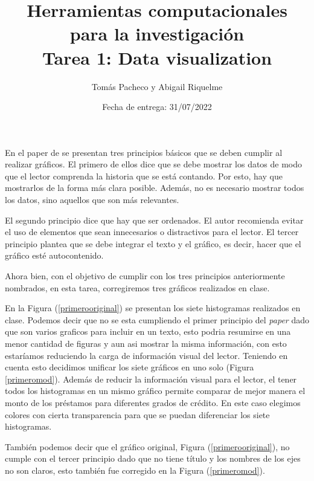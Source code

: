 \documentclass[12pt]{article}
\title{ %
Herramientas computacionales para la investigaci\'on \\
\vspace{0.3cm}
\textbf{Tarea 1: Data visualization}}
\author{Tom\'as Pacheco y Abigail Riquelme}
\date{Fecha de entrega: 31/07/2022}
\begin{document}
\maketitle
\onehalfspace



En el paper de \citet{schwabish2014economist} se presentan tres principios básicos que se deben cumplir al realizar gráficos. El primero de ellos dice que se debe mostrar los datos de modo que el lector comprenda la historia que se está contando. Por esto, hay que mostrarlos de la forma más clara posible. Además, no es necesario mostrar todos los datos, sino aquellos que son más relevantes. 

El segundo principio dice que hay que ser ordenados. El autor recomienda evitar el uso de elementos que sean innecesarios o distractivos para el lector. El tercer principio plantea que se debe integrar el texto y el gráfico, es decir, hacer que el gráfico esté autocontenido.

Ahora bien, con el objetivo de cumplir con los tres principios anteriormente nombrados, en esta tarea, corregiremos tres gráficos realizados en clase. 

En la Figura (\ref{primerooriginal}) se presentan los siete histogramas realizados en clase. Podemos decir que no se esta cumpliendo el primer principio del \textit{paper} dado que son varios graficos para incluir en un texto, esto podria resumirse en una menor cantidad de figuras y aun asi mostrar la misma informaci\'on, con esto estar\'iamos reduciendo la carga de informaci\'on visual del lector. Teniendo en cuenta esto decidimos unificar los siete gr\'aficos en uno solo (Figura \ref{primeromod}). Adem\'as de reducir la informaci\'on visual para el lector, el tener todos los histogramas en un mismo gr\'afico permite comparar de mejor manera el monto de los pr\'estamos para diferentes grados de cr\'edito. En este caso elegimos colores con cierta transparencia para que se puedan diferenciar los siete histogramas. 

También podemos decir que el gráfico original, Figura (\ref{primerooriginal}), no cumple con el tercer principio dado que no tiene título y los nombres de los ejes no son claros, esto también fue corregido en la Figura (\ref{primeromod}). 
\end{document}

